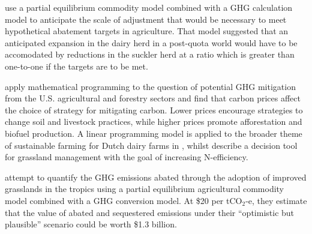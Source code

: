 \documentclass[12pt]{report}
\begin{document}

\cite{donnellan09a} use a partial equilibrium commodity model combined with a GHG calculation model to anticipate the scale of adjustment that would be necessary to meet hypothetical abatement targets in agriculture. That model suggested that an anticipated expansion in the dairy herd in a post-quota world would have to be accomodated by reductions in the suckler herd at a ratio which is greater than one-to-one if the targets are to be met. %

\cite{schneider02} apply mathematical programming to the question of potential GHG mitigation from the U.S. agricultural and forestry sectors and find that carbon prices affect the choice of strategy for mitigating carbon. Lower prices encourage strategies to change soil and livestock practices, while higher prices promote afforestation and biofuel production. A linear programming model is applied to the broader theme of sustainable farming for Dutch dairy farms in \cite{vancalker04}, whilst \cite{brown05} describe a decision tool for grassland management with the goal of increasing N-efficiency.

\cite{thornton10} attempt to quantify the GHG emissions abated through the adoption of improved grasslands in the tropics using a partial equilibrium agricultural commodity model combined with a GHG conversion model. At \$20 per tCO$_2$-e, they estimate that the value of abated and sequestered emissions under their ``optimistic but plausible'' scenario could be worth \$1.3 billion.
\end{document}
